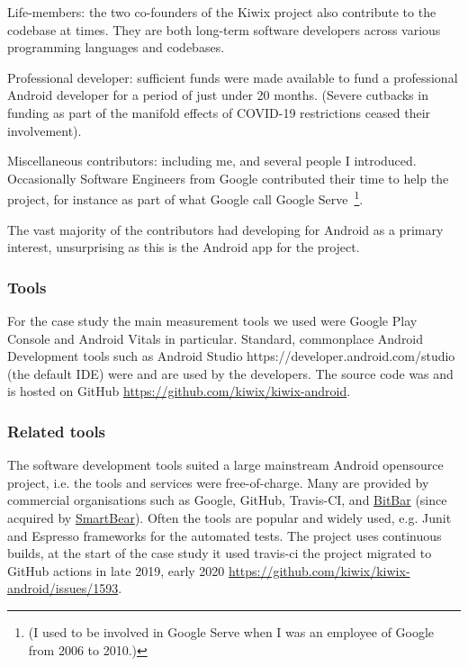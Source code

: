 Life-members: the two co-founders of the Kiwix project also contribute to the codebase at times. They are both long-term software developers across various programming languages and codebases.

Professional developer: sufficient funds were made available to fund a professional Android developer for a period of just under 20 months. (Severe cutbacks in funding as part of the manifold effects of COVID-19 restrictions ceased their involvement).

Miscellaneous contributors: including me, and several people I introduced. Occasionally Software Engineers from Google contributed their time to help the project, for instance as part of what Google call Google Serve~\footnote{(I used to be involved in Google Serve when I was an employee of Google from 2006 to 2010.)}.


The vast majority of the contributors had developing for Android as a primary interest, unsurprising as this is the Android app for the project.

\subsubsection{Tools}
For the case study the main measurement tools we used were Google Play Console and Android Vitals in particular. Standard, commonplace Android Development tools such as Android Studio https://developer.android.com/studio (the default IDE) were and are used by the developers. The source code was and is hosted on GitHub \url{https://github.com/kiwix/kiwix-android}.


\subsubsection{Related tools}
The software development tools suited a large mainstream Android opensource project, i.e. the tools and services were free-of-charge. Many are provided by commercial organisations such as Google, GitHub, Travis-CI, and \href{https://bitbar.com/}{BitBar} (since acquired by \href{https://smartbear.com/}{SmartBear}). Often the tools are popular and widely used, e.g. Junit and Espresso frameworks for the automated tests. The project uses continuous builds, at the start of the case study it used travis-ci the project migrated to GitHub actions in late 2019, early 2020 \url{https://github.com/kiwix/kiwix-android/issues/1593}.

